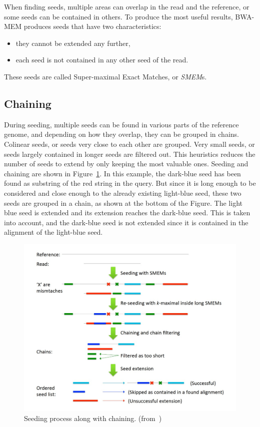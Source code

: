 When finding seeds, multiple areas can overlap in the read and the reference, or some seeds can be contained in others. To produce the most useful results, BWA-MEM produces seeds that have two characteristics:
\begin{itemize}
    \item they cannot be extended any further,
    \item each seed is not contained in any other seed of the read.
\end{itemize}
These seeds are called Super-maximal Exact Matches, or \emph{SMEM}s\cite{li:smem}.

\subsection{Chaining}
During seeding, multiple seeds can be found in various parts of the reference genome, and depending on how they overlap, they can be grouped in chains. Colinear seeds, or seeds very close to each other are grouped. Very small seeds, or seeds largely contained in longer seeds are filtered out. This heuristics reduces the number of seeds to extend by only keeping the most valuable ones. Seeding and chaining are shown in Figure~\ref{fig:poster-seeding}. In this example, the dark-blue seed has been found as substring of the red string in the query. But since it is long enough to be considered and close enough to the already existing light-blue seed, these two seeds are grouped in a chain, as shown at the bottom of the Figure. The light blue seed is extended and its extension reaches the dark-blue seed. This is taken into account, and the dark-blue seed is not extended since it is contained in the alignment of the light-blue seed.

\begin{figure}
    \centering
    \includegraphics[width=0.9\linewidth]{poster_seeding}
    \caption{Seeding process along with chaining. (from~\cite{poster:bwa})}
    \label{fig:poster-seeding}
\end{figure}{}

